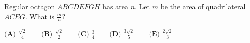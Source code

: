 Regular octagon $ABCDEFGH$ has area $n$. Let $m$ be the area of quadrilateral $ACEG$. What is $\tfrac{m}{n}?$

$\textbf{(A) } \frac{\sqrt{2}}{4} \qquad \textbf{(B) } \frac{\sqrt{2}}{2} \qquad \textbf{(C) } \frac{3}{4} \qquad \textbf{(D) } \frac{3\sqrt{2}}{5} \qquad \textbf{(E) } \frac{2\sqrt{2}}{3}$